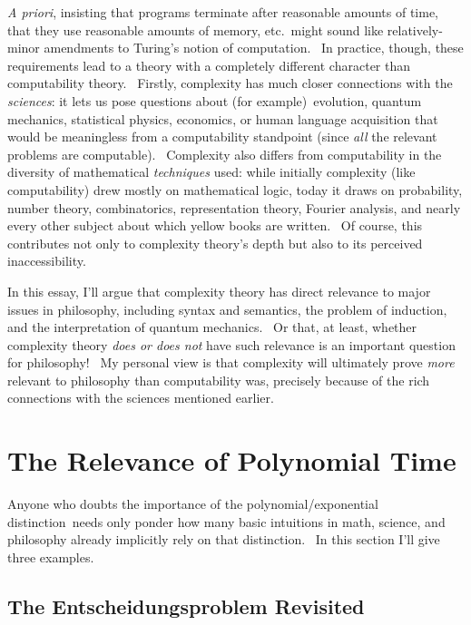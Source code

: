 \documentclass[11pt,onecolumn]{article}%
\begin{document}
\textit{A priori}, insisting that programs terminate after reasonable amounts
of time, that they use reasonable amounts of memory, etc.\ might sound like
relatively-minor amendments to Turing's notion of computation. \ In practice,
though, these requirements lead to a theory with a completely different
character than computability theory. \ Firstly, complexity has much closer
connections with the \textit{sciences}: it lets us pose questions about (for
example)\ evolution, quantum mechanics, statistical physics, economics, or
human language acquisition that would be meaningless from a computability
standpoint (since \textit{all} the relevant problems are computable).
\ Complexity also differs from computability in the diversity of mathematical
\textit{techniques} used: while initially complexity (like computability) drew
mostly on mathematical logic, today it draws on probability, number theory,
combinatorics, representation theory, Fourier analysis, and nearly every other
subject about which yellow books are written. \ Of course, this contributes
not only to complexity theory's depth but also to its perceived inaccessibility.

In this essay, I'll argue that complexity theory has direct relevance to major
issues in philosophy, including syntax and semantics, the problem of
induction, and the interpretation of quantum mechanics. \ Or that, at least,
whether complexity theory \textit{does or does not} have such relevance is an
important question for philosophy! \ My personal view is that complexity will
ultimately prove \textit{more} relevant to philosophy than computability was,
precisely because of the rich connections with the sciences mentioned earlier.

\section{The Relevance of Polynomial Time\label{CTP}}

Anyone who doubts the importance of the polynomial/exponential
distinction\ needs only ponder how many basic intuitions in math, science, and
philosophy already implicitly rely on that distinction. \ In this section I'll
give three examples.

\subsection{The Entscheidungsproblem Revisited\label{ENTSCH}}
\end{document}
